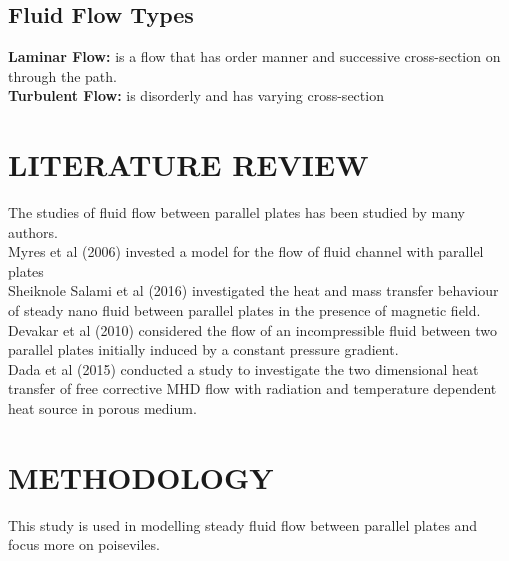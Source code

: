 \documentclass[12pt]{report}
\newcommand{\bt}[1]{\textbf{#1}}
\newcommand{\sps}{\\[0.2cm]}
\begin{document}
	\section{Fluid Flow Types}
	\bt{Laminar Flow:} is a flow that has order manner and successive cross-section on through the path.\sps
	\bt{Turbulent Flow:} is disorderly and has varying cross-section
	
	
	\chapter{LITERATURE REVIEW}
	The studies of fluid flow between parallel plates has been studied by many authors.\sps
	Myres et al (2006) invested a model for the flow of fluid channel with parallel plates\sps
	Sheiknole Salami et al (2016) investigated the heat and mass transfer behaviour of steady nano fluid between parallel plates in the presence of magnetic field.\sps
	Devakar et al (2010) considered the flow of an incompressible fluid between two parallel plates initially induced by a constant pressure gradient.\sps
	Dada et al (2015) conducted a study to investigate the two dimensional heat transfer of free corrective MHD flow with radiation and temperature dependent heat source in porous medium.

	
	
	\chapter{METHODOLOGY}
	This study is used in modelling steady fluid flow between parallel plates and focus more on poiseviles.
	
\end{document}
